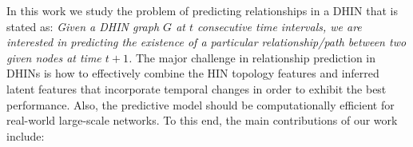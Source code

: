 In this work we study the problem of predicting relationships in a DHIN that is stated as: \textit{Given a DHIN graph $G$ at $t$ consecutive time intervals, we are interested in predicting the existence of a particular relationship/path between two given nodes at time $t+1$.} The major challenge in relationship prediction in DHINs is how to effectively combine the HIN topology features and inferred latent features that incorporate temporal changes in order to exhibit the best performance. Also, the predictive model should be computationally efficient for real-world large-scale networks. To this end, the main contributions of our work include:












